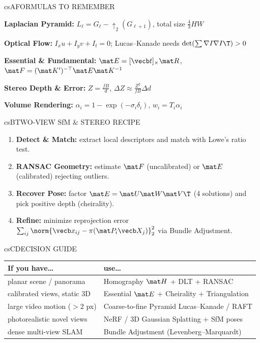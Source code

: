 \documentclass[../../../../master.tex]{subfiles}
\begin{document}
\begin{cscolumns}
\begin{cscard}{csA}{FORMULAS TO REMEMBER}
  \begin{csbul}
    \item \textbf{Laplacian Pyramid:} $L_\ell = G_\ell - \uparrow_2(G_{\ell+1})$, total size $\frac{4}{3}HW$
    \item \textbf{Optical Flow:} $I_x u + I_y v + I_t = 0$; Lucas--Kanade needs $\det(\sum \nabla I\nabla I\T)>0$
    \item \textbf{Essential \& Fundamental:} $\mat E=[\vecb t]_\times\mat R$, $\mat F=(\mat K')^{-\top}\mat E\mat K^{-1}$
    \item \textbf{Stereo Depth \& Error:} $Z=\frac{fB}{d}$, $\Delta Z \approx \frac{Z^2}{fB}\Delta d$
    \item \textbf{Volume Rendering:} $\alpha_i = 1-\exp(-\sigma_i\delta_i)$, $w_i = T_i\alpha_i$
  \end{csbul}
\end{cscard}

\begin{cscard}{csB}{TWO-VIEW SfM \& STEREO RECIPE}
  \begin{enumerate}[leftmargin=1.2em, itemsep=1pt, topsep=1pt, parsep=0pt]
    \item \textbf{Detect \& Match:} extract local descriptors and match with Lowe's ratio test.
    \item \textbf{RANSAC Geometry:} estimate $\mat F$ (uncalibrated) or $\mat E$ (calibrated) rejecting outliers.
    \item \textbf{Recover Pose:} factor $\mat E=\mat U\mat W\mat V\T$ (4 solutions) and pick positive depth (cheirality).
    \item \textbf{Refine:} minimize reprojection error $\sum_{ij}\norm{\vecb x_{ij}-\pi(\mat P_i\vecb X_j)}_2^2$ via Bundle Adjustment.
  \end{enumerate}
\end{cscard}
\columnbreak

\begin{cscard}{csC}{DECISION GUIDE}
  \renewcommand{\arraystretch}{1.18}\small
  \begin{tabular}{@{}>{\raggedright\arraybackslash}p{3.1cm}>{\raggedright\arraybackslash}p{4.6cm}@{}}
    \textbf{If you have\ldots} & \textbf{use\ldots}\\ \hline
    planar scene / panorama & Homography $\mat H$ + DLT + RANSAC\\
    2 calibrated views, static 3D & Essential $\mat E$ + Cheirality + Triangulation\\
    large video motion ($>2$ px) & Coarse-to-fine Pyramid Lucas--Kanade / RAFT\\
    photorealistic novel views & NeRF / 3D Gaussian Splatting + SfM poses\\
    dense multi-view SLAM & Bundle Adjustment (Levenberg--Marquardt)\\
  \end{tabular}
\end{cscard}


\end{cscolumns}
\end{document}

